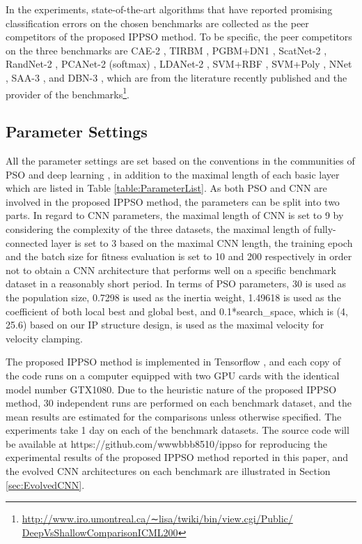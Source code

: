 \documentclass[conference]{IEEEtran}
\begin{document}
In the experiments, state-of-the-art algorithms that have reported promising classification errors on the chosen benchmarks are collected as the peer competitors of the proposed IPPSO method. To be specific, the peer competitors on the three benchmarks are CAE-2 \cite{CAE:Rifai}, TIRBM \cite{TIRBM:Sohn}, PGBM+DN1 \cite{PGBMDN1:Sohn}, ScatNet-2 \cite{ScatteringCNN:Bruna}, RandNet-2 \cite{DLBaseline:Chan}, PCANet-2 (softmax) \cite{DLBaseline:Chan}, LDANet-2 \cite{DLBaseline:Chan}, SVM+RBF \cite{DeepArchitectureEval:Larochelle}, SVM+Poly \cite{DeepArchitectureEval:Larochelle}, NNet \cite{DeepArchitectureEval:Larochelle}, SAA-3 \cite{DeepArchitectureEval:Larochelle}, and DBN-3 \cite{DeepArchitectureEval:Larochelle}, which are from the literature \cite{DLBaseline:Chan} recently published and the provider of the benchmarks\footnote{\url{http://www.iro.umontreal.ca/∼lisa/twiki/bin/view.cgi/Public/ DeepVsShallowComparisonICML200}}. 

\subsection{Parameter Settings}

All the parameter settings are set based on the conventions in the communities of PSO \cite{PSOEPSettings:Van} and deep learning \cite{DLGuide:Hinton}, in addition to the maximal length of each basic layer which are listed in Table \ref{table:ParameterList}. As both PSO and CNN are involved in the proposed IPPSO method, the parameters can be split into two parts. In regard to CNN parameters, the maximal length of CNN is set to 9 by considering the complexity of the three datasets, the maximal length of fully-connected layer is set to 3 based on the maximal CNN length, the training epoch and the batch size for fitness evaluation is set to 10 and 200 respectively in order not to obtain a CNN architecture that performs well on a specific benchmark dataset in a reasonably short period. In terms of PSO parameters, 30 is used as the population size, 0.7298 is used as the inertia weight, 1.49618 is used as the coefficient of both local best and global best, and 0.1*search\_space, which is (4, 25.6) based on our IP structure design, is used as the maximal velocity for velocity clamping. 

The proposed IPPSO method is implemented in Tensorﬂow \cite{Tensorfow:Abadi}, and each copy of the code runs on a computer equipped with two GPU cards with the identical model number GTX1080. Due to the heuristic nature of the proposed IPPSO method, 30 independent runs are performed on each benchmark dataset, and the mean results are estimated for the comparisons unless otherwise specified. The experiments take 1 day on each of the benchmark datasets. The source code will be available at https://github.com/wwwbbb8510/ippso for reproducing the experimental results of the proposed IPPSO method reported in this paper, and the evolved CNN architectures on each benchmark are illustrated in Section \ref{sec:EvolvedCNN}.
\end{document}

